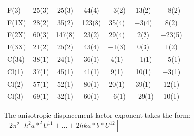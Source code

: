 \begin{center}
{\begin{supertabular}{lcccccc}
F(3)&25(3) &25(3)&44(4) &$-$3(2)&13(2) &$-$8(2)\\
F(1X)&28(2) &35(2)&123(8) &35(4)&$-$3(4) &8(2)\\
F(2X)&60(3) &147(8)&23(2) &29(4)&2(2) &$-$23(5)\\
F(3X)&21(2) &25(2)&43(4) &$-$1(3)&0(3) &1(2)\\
C(34)&38(1) &24(1)&36(1) &4(1)&$-$1(1) &$-$5(1)\\
Cl(1)&37(1) &45(1)&41(1) &9(1)&10(1) &$-$3(1)\\
Cl(2)&57(1) &52(1)&80(1) &20(1)&39(1) &12(1)\\
Cl(3)&69(1) &32(1)&60(1) &$-$6(1)&$-$29(1) &10(1)\\
\end{supertabular}
}
\end{center}

{ \footnotesize
The anisotropic displacement factor exponent takes the form: 
$-2\pi^2\left[ h^2a*^2U^{11} + ... + 2 h k a* b* U^{12} \right]$ }

\pagebreak



